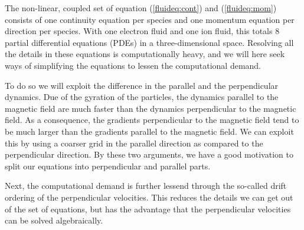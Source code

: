 The non-linear, coupled set of equation (\ref{fluideq:cont}) and (\ref{fluideq:mom}) consists of one continuity equation per species and one momentum equation per direction per species.
With one electron fluid and one ion fluid, this totals $8$ partial differential equations (PDEs) in a three-dimensional space.
Resolving all the details in these equations is computationally heavy, and we will here seek ways of simplifying the equations to lessen the computational demand.

To do so we will exploit the difference in the parallel and the perpendicular dynamics.
Due of the gyration of the particles, the dynamics parallel to the magnetic field are much faster than the dynamics perpendicular to the magnetic field.
As a consequence, the gradients perpendicular to the magnetic field tend to be much larger than the gradients parallel to the magnetic field.
We can exploit this by using a coarser grid in the parallel direction as compared to the perpendicular direction.
By these two arguments, we have a good motivation to split our equations into perpendicular and parallel parts.

Next, the computational demand is further lessend through the so-called drift ordering of the perpendicular velocities.
This reduces the details we can get out of the set of equations, but has the advantage that the perpendicular velocities can be solved algebraically.

